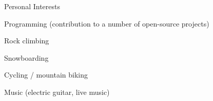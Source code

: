 \documentclass{cv}
\begin{document}

\begin{rSection}{Personal Interests}

\begin{rSubsection}{}{}{}{}
\item Programming (contribution to a number of open-source projects)
\item Rock climbing
\item Snowboarding
\item Cycling / mountain biking
\item Music (electric guitar, live music)
\end{rSubsection}

\end{rSection}

\end{document}

